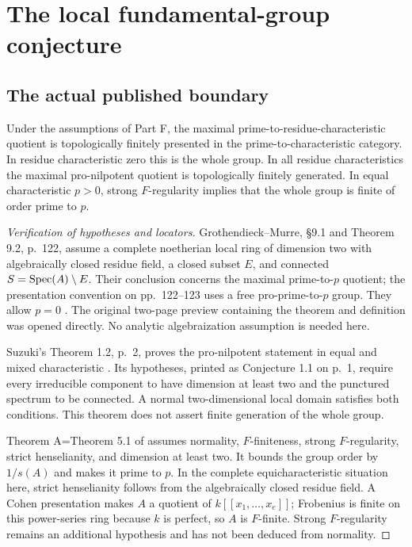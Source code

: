 \section{The local fundamental-group conjecture}\label{sec:F}
\subsection{The actual published boundary}
\begin{proposition}\label{f:known}
Under the assumptions of Part F, the maximal prime-to-residue-characteristic
quotient is topologically finitely presented in the prime-to-characteristic
category. In residue characteristic zero this is the whole group.
In all residue characteristics the maximal pro-nilpotent quotient is
topologically finitely generated. In equal characteristic $p>0$, strong
$F$-regularity implies that the whole group is finite of order prime to $p$.
\end{proposition}
\begin{proof}[Verification of hypotheses and locators]
Grothendieck--Murre, \S9.1 and Theorem 9.2, p.~122, assume a complete
noetherian local ring of dimension two with algebraically closed residue
field, a closed subset $E$, and connected $S=\operatorname{Spec}(A)\setminus E$.
Their conclusion concerns the maximal prime-to-$p$ quotient; the
presentation convention on pp.~122--123 uses a free pro-prime-to-$p$
group. They allow $p=0$ \cite{GrothendieckMurre1971}.
The original two-page preview containing the theorem and definition was
opened directly. No analytic algebraization assumption is needed here.

Suzuki's Theorem 1.2, p.~2, proves the pro-nilpotent statement in equal
and mixed characteristic \cite{Suzuki2023}. Its hypotheses, printed as
Conjecture 1.1 on p.~1, require every irreducible component to have
dimension at least two and the punctured spectrum to be connected.
A normal two-dimensional local domain satisfies both conditions.
This theorem does not assert finite generation of the whole group.

Theorem A=Theorem 5.1 of \cite[p.~994]{CRST2018} assumes normality,
$F$-finiteness, strong $F$-regularity, strict henselianity, and dimension
at least two. It bounds the group order by $1/s(A)$ and makes it prime
to $p$. In the complete equicharacteristic situation here, strict
henselianity follows from the algebraically closed residue field.
A Cohen presentation makes $A$ a quotient of $k[[x_1,\ldots,x_e]]$;
Frobenius is finite on this power-series ring because $k$ is perfect,
so $A$ is $F$-finite. Strong $F$-regularity remains an additional
hypothesis and has not been deduced from normality.
\end{proof}

